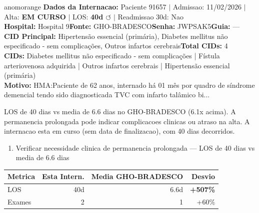 \documentclass[a4paper,10pt]{article}
\begin{document}
\begin{anomalycard}[Internacao 116947 | GHO-BRADESCO | ALTO (z=3.28)]{anomorange}
\textbf{Dados da Internacao:} Paciente 91657 $\mid$ Admissao: 11/02/2026 $\mid$ Alta: \textcolor{anomorange}{\textbf{EM CURSO}} $\mid$ LOS: \textbf{40d \textcolor{anomorange}{$\circlearrowleft$}} $\mid$ Readmissao 30d: Nao\\
\textbf{Hospital:} Hospital 9\quad\textbf{Fonte:} GHO-BRADESCO\quad\textbf{Senha:} JWPSAK5\quad\textbf{Guia:} ---\\
\textbf{CID Principal:} {\small Hipertensão essencial (primária), Diabetes mellitus não especificado - sem complicações, Outros infartos cerebrais}\quad\textbf{Total CIDs:} 4\\

\textbf{CIDs:} {\scriptsize Diabetes mellitus não especificado - sem complicações | Fístula arteriovenosa adquirida | Outros infartos cerebrais | Hipertensão essencial (primária)}\\

\textbf{Motivo:} {\scriptsize HMA:Paciente de 62 anos, internado há 01 mês por quadro de síndrome demencial tendo sido diagnosticada TVC com infarto talâmico bi...}\\

\vspace{2pt}\begin{tcolorbox}[colback=severityred!20,colframe=anomorange,title={\textbf{Interpretacao de Negocio}},fonttitle=\bfseries\small,left=4pt,right=4pt,top=3pt,bottom=3pt]
{\small LOS de 40 dias vs media de 6.6 dias no GHO-BRADESCO (6.1x acima). A permanencia prolongada pode indicar complicacoes clinicas ou atraso na alta. A internacao esta em curso (sem data de finalizacao), com 40 dias decorridos.}
\end{tcolorbox}
\begin{tcolorbox}[colback=severityyellow!30,colframe=anomorange,title={\textbf{Recomendacoes Especificas}},fonttitle=\bfseries\small,left=4pt,right=4pt,top=3pt,bottom=3pt]
\begin{enumerate}[nosep,leftmargin=16pt]
\item {\small Verificar necessidade clinica de permanencia prolongada --- LOS de 40 dias vs media de 6.6 dias}
\end{enumerate}
\end{tcolorbox}
\begin{center}\begin{tabular}{l r r r}\toprule\textbf{Metrica} & \textbf{Esta Intern.} & \textbf{Media GHO-BRADESCO} & \textbf{Desvio} \\\midrule
LOS & 40d & 6.6d & \textcolor{anomred}{\textbf{+507\%}} \\
Exames & 2 & 1 & \textcolor{anomorange}{+60\%} \\
\bottomrule\end{tabular}\end{center}


\end{anomalycard}
\end{document}
